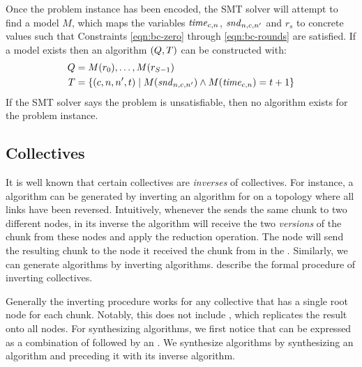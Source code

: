 Once the problem instance has been encoded, the SMT solver will
attempt to find a model $M$, which maps the variables $\mathit{time}_{c,n}$,
$\mathit{snd}_{n,c,n'}$ and $r_s$ to concrete values such that Constraints
\ref{eqn:bc-zero} through \ref{eqn:bc-rounds} are satisfied. If a
model exists then an algorithm $(Q, T)$ can be constructed
with:
\begin{align*}
    Q&=M(r_0),\dotsc,M(r_{S-1}) \\
    T&=\{(c,n,n',t) \;|\; M(\mathit{snd}_{n,c,n'}) \wedge M(\mathit{time}_{c,n}) = t+1 \}
\end{align*}
If the SMT solver says the problem is unsatisfiable, then no algorithm
exists for the problem instance.


\subsection{\reducingCap Collectives}
\label{sec:reduction}
It is well known that certain \reducing collectives are {\em inverses}
of \broadcasting collectives. For instance, a \reduce algorithm can be
generated by inverting an algorithm for \broadcast on a topology where
all links have been reversed. Intuitively, whenever the \broadcast
sends the same chunk to two different nodes, in its inverse the
\reduce algorithm will receive the two {\em versions} of the chunk
from these nodes and apply the reduction operation. The node will send
the resulting chunk to the node it received the chunk from in the
\broadcast. Similarly, we can generate \reducescatter algorithms by
inverting \allgather algorithms. %
describe the formal procedure of inverting \broadcasting collectives.

Generally the inverting procedure works for any \reducing collective
that has a single root node for each chunk. Notably, this does not
include \allreduce, which replicates the result onto all nodes. For
synthesizing \allreduce algorithms, we first notice that \allreduce
can be expressed as a combination of \reducescatter followed by an
\allgather. We synthesize \allreduce algorithms by synthesizing an
\allgather algorithm and preceding it with its inverse \reducescatter
algorithm.

